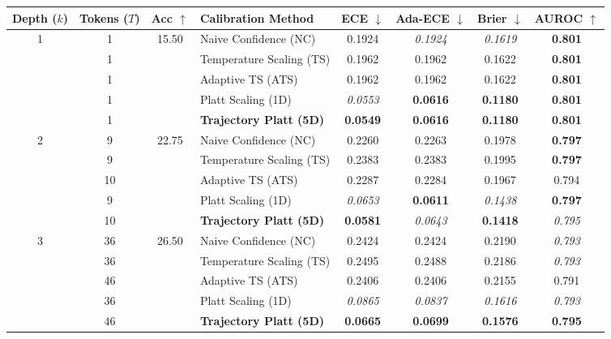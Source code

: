 \begin{table}[t]
\setlength{\tabcolsep}{4pt}
\renewcommand{\arraystretch}{1.05}
\centering
\footnotesize
\begin{tabular}{ccclcccc}
\toprule
\textbf{Depth ($k$)} & \textbf{Tokens ($T$)} & \textbf{Acc} $\uparrow$ & \textbf{Calibration Method} & \textbf{ECE} $\downarrow$ & \textbf{Ada-ECE} $\downarrow$ & \textbf{Brier} $\downarrow$ & \textbf{AUROC} $\uparrow$ \\
\midrule
\multirow{5}{*}{1} & 1 & \multirow{5}{*}{15.50} & Naive Confidence (NC) & 0.1924 & \textit{0.1924} & \textit{0.1619} & \textbf{0.801} \\
 & 1 &  & Temperature Scaling (TS) & 0.1962 & 0.1962 & 0.1622 & \textbf{0.801} \\
 & 1 &  & Adaptive TS (ATS) & 0.1962 & 0.1962 & 0.1622 & \textbf{0.801} \\
 & 1 &  & Platt Scaling (1D) & \textit{0.0553} & \textbf{0.0616} & \textbf{0.1180} & \textbf{0.801} \\
 & 1 &  & \textbf{Trajectory Platt (5D)} & \textbf{0.0549} & \textbf{0.0616} & \textbf{0.1180} & \textbf{0.801} \\
\midrule
\multirow{5}{*}{2} & 9 & \multirow{5}{*}{22.75} & Naive Confidence (NC) & 0.2260 & 0.2263 & 0.1978 & \textbf{0.797} \\
 & 9 &  & Temperature Scaling (TS) & 0.2383 & 0.2383 & 0.1995 & \textbf{0.797} \\
 & 10 &  & Adaptive TS (ATS) & 0.2287 & 0.2284 & 0.1967 & 0.794 \\
 & 9 &  & Platt Scaling (1D) & \textit{0.0653} & \textbf{0.0611} & \textit{0.1438} & \textbf{0.797} \\
 & 10 &  & \textbf{Trajectory Platt (5D)} & \textbf{0.0581} & \textit{0.0643} & \textbf{0.1418} & \textit{0.795} \\
\midrule
\multirow{5}{*}{3} & 36 & \multirow{5}{*}{26.50} & Naive Confidence (NC) & 0.2424 & 0.2424 & 0.2190 & \textit{0.793} \\
 & 36 &  & Temperature Scaling (TS) & 0.2495 & 0.2488 & 0.2186 & \textit{0.793} \\
 & 46 &  & Adaptive TS (ATS) & 0.2406 & 0.2406 & 0.2155 & 0.791 \\
 & 36 &  & Platt Scaling (1D) & \textit{0.0865} & \textit{0.0837} & \textit{0.1616} & \textit{0.793} \\
 & 46 &  & \textbf{Trajectory Platt (5D)} & \textbf{0.0665} & \textbf{0.0699} & \textbf{0.1576} & \textbf{0.795} \\
\midrule

\end{tabular}
\end{table}
